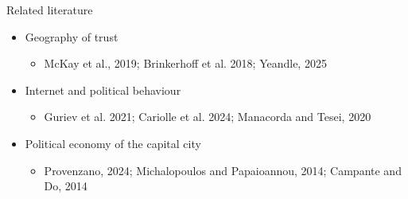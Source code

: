 \documentclass[aspectratio=169,xcolor=dvipsnames]{beamer}
\begin{document}
\begin{frame}{Related literature}
    \begin{itemize}
        \item Geography of trust\\
        \vfill
        \begin{itemize}
            \item McKay et al., 2019; Brinkerhoff et al. 2018; Yeandle, 2025\\
        \vfill
        \end{itemize}
        \item Internet and political behaviour\\
        \vfill
        \begin{itemize}
            \item Guriev et al. 2021; Cariolle et al. 2024; Manacorda and Tesei, 2020\\
        \vfill
        \end{itemize}
        \item Political economy of the capital city\\
        \vfill
        \begin{itemize}
            \item Provenzano, 2024; Michalopoulos and Papaioannou, 2014; Campante and Do, 2014\\
        \vfill
        \end{itemize}
    \end{itemize}
\end{frame}
\end{document}
